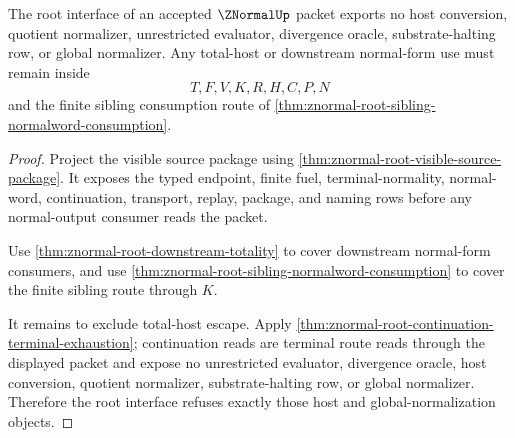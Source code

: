 \begin{theorem}
\label{thm:znormal-root-total-host-refusal}
The root interface of an accepted $\ZNormalUp$ packet exports no host conversion, quotient normalizer, unrestricted evaluator, divergence oracle, substrate-halting row, or global normalizer. Any total-host or downstream normal-form use must remain inside
$$
T,F,V,K,R,H,C,P,N
$$
and the finite sibling consumption route of \autoref{thm:znormal-root-sibling-normalword-consumption}.
\end{theorem}
\begin{proof}
Project the visible source package using \autoref{thm:znormal-root-visible-source-package}. It exposes the typed endpoint, finite fuel, terminal-normality, normal-word, continuation, transport, replay, package, and naming rows before any normal-output consumer reads the packet.

Use \autoref{thm:znormal-root-downstream-totality} to cover downstream normal-form consumers, and use \autoref{thm:znormal-root-sibling-normalword-consumption} to cover the finite sibling route through $K$.

It remains to exclude total-host escape. Apply \autoref{thm:znormal-root-continuation-terminal-exhaustion}; continuation reads are terminal route reads through the displayed packet and expose no unrestricted evaluator, divergence oracle, host conversion, quotient normalizer, substrate-halting row, or global normalizer. Therefore the root interface refuses exactly those host and global-normalization objects.
\end{proof}

